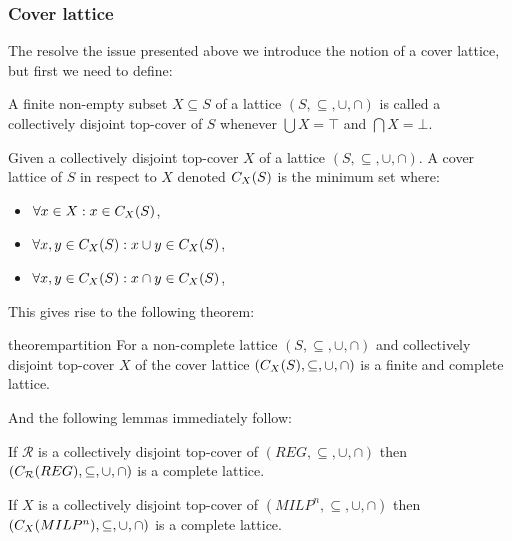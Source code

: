 \subsubsection{Cover lattice}

The resolve the issue presented above we introduce the notion of a cover lattice, but first we need to define:

\begin{definition}
    A finite non-empty subset $X \subseteq S$ of a lattice $(S, \subseteq, \cup, \cap)$ is called a collectively disjoint top-cover of $S$ whenever $\bigcup X = \top$ and $\bigcap X = \bot$.
\end{definition}

\begin{definition}
    Given a collectively disjoint top-cover $X$ of a lattice $(S, \subseteq, \cup, \cap)$.
    A cover lattice of $S$ in respect to $X$ denoted $C_{X}(S)$ is the minimum set where:
    \begin{itemize}
        \item $\forall x \in X: x \in C_{X}(S)$,
        \item $\forall x, y \in C_{X}(S) : x \cup y \in C_{X}(S)$,
        \item $\forall x, y \in C_{X}(S) : x \cap y \in C_{X}(S)$,
    \end{itemize}
\end{definition}

This gives rise to the following theorem:

\begin{restatable}{theorem}{partition}\label{thm:partition}
    For a non-complete lattice $(S, \subseteq, \cup, \cap)$ and collectively disjoint top-cover $X$ of the cover lattice $(C_{X}(S), \subseteq, \cup, \cap)$ is a finite and complete lattice.
\end{restatable}

And the following lemmas immediately follow:

\begin{lemma}
    If $\mathcal{R}$ is a collectively disjoint top-cover of $(REG, \subseteq, \cup, \cap)$ then $(C_{\mathcal{R}}(REG), \subseteq, \cup, \cap)$ is a complete lattice.
\end{lemma}

\begin{lemma}
    If $X$ is a collectively disjoint top-cover of $(MILP^n, \subseteq, \cup, \cap)$ then $(C_{X}(MILP^n), \subseteq, \cup, \cap)$ is a complete lattice.
\end{lemma}

